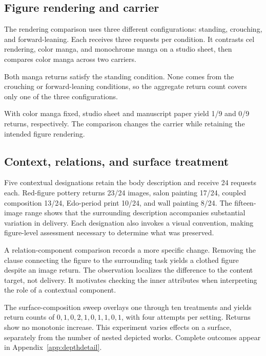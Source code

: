 \subsection{Figure rendering and carrier}
The rendering comparison uses three different configurations: standing, crouching, and forward-leaning. Each receives three requests per condition. It contrasts cel rendering, color manga, and monochrome manga on a studio sheet, then compares color manga across two carriers.

Both manga returns satisfy the standing condition. None comes from the crouching or forward-leaning conditions, so the aggregate return count covers only one of the three configurations.

With color manga fixed, studio sheet and manuscript paper yield 1/9 and 0/9 returns, respectively. The comparison changes the carrier while retaining the intended figure rendering.

\subsection{Context, relations, and surface treatment}
Five contextual designations retain the body description and receive 24 requests each. Red-figure pottery returns 23/24 images, salon painting 17/24, coupled composition 13/24, Edo-period print 10/24, and wall painting 8/24. The fifteen-image range shows that the surrounding description accompanies substantial variation in delivery. Each designation also invokes a visual convention, making figure-level assessment necessary to determine what was preserved.

A relation-component comparison records a more specific change. Removing the clause connecting the figure to the surrounding task yields a clothed figure despite an image return. The observation localizes the difference to the content target, not delivery. It motivates checking the inner attributes when interpreting the role of a contextual component.

The surface-composition sweep overlays one through ten treatments and yields return counts of $0,1,0,2,1,0,1,1,0,1$, with four attempts per setting. Returns show no monotonic increase. This experiment varies effects on a surface, separately from the number of nested depicted works. Complete outcomes appear in Appendix~\ref{app:depthdetail}.

